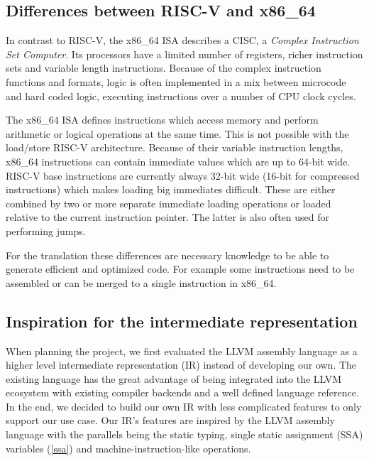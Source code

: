\documentclass[course=eragp]{aspdoc}
\begin{document}
\subsection{Differences between RISC-V and x86\_64}
In contrast to RISC-V, the x86\_64 ISA describes a CISC, a \emph{Complex Instruction Set Computer}.
Its processors have a limited number of registers, richer instruction sets and variable length
instructions. Because of the complex instruction functions and formats, logic is often implemented
in a mix between microcode and hard coded logic, executing instructions over a number of CPU clock
cycles.\cite{RISCvCISC}

\par

The x86\_64 ISA defines instructions which access memory and perform arithmetic or logical
operations at the same time. This is not possible with the load/store RISC-V architecture. Because
of their variable instruction lengths, x86\_64 instructions can contain immediate values which are
up to 64-bit wide.\cite[Vol.~2B~p.~4-35]{intel2017man} RISC-V base instructions are currently always
32-bit wide (16-bit for compressed instructions)\cite[p.~8]{rvspec} which makes loading big
immediates difficult. These are either combined by two or more separate immediate loading operations
or loaded relative to the current instruction pointer.\cite[p.~19]{rvspec} The latter is also often
used for performing jumps.\cite [p.~20]{rvspec}

\par

For the translation these differences are necessary knowledge to be able to generate efficient and
optimized code. For example some instructions need to be assembled or can be merged to a single
instruction in x86\_64.

\subsection{Inspiration for the intermediate representation}

When planning the project, we first evaluated the LLVM assembly language as a higher level
intermediate representation (IR) instead of developing our own. The existing language has the great advantage of
being integrated into the LLVM ecosystem with existing compiler backends and a well defined language reference. In
the end, we decided to build our own IR with less complicated features to only support our use case.
Our IR's features are inspired by the LLVM assembly language with the parallels being the static
typing, single static assignment (SSA) variables (\ref{ssa}) and machine-instruction-like operations.
\end{document}
